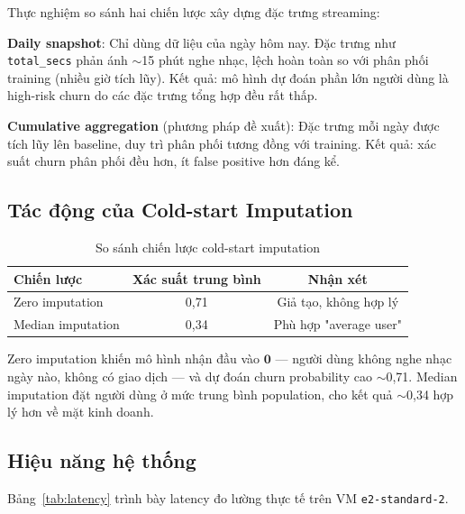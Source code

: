\documentclass[conference]{IEEEtran}
\begin{document}
Thực nghiệm so sánh hai chiến lược xây dựng đặc trưng streaming:

\textbf{Daily snapshot}: Chỉ dùng dữ liệu của ngày hôm nay. Đặc trưng như
\texttt{total\_secs} phản ánh $\sim$15 phút nghe nhạc, lệch hoàn toàn so với
phân phối training (nhiều giờ tích lũy). Kết quả: mô hình dự đoán phần lớn
người dùng là high-risk churn do các đặc trưng tổng hợp đều rất thấp.

\textbf{Cumulative aggregation} (phương pháp đề xuất): Đặc trưng mỗi ngày
được tích lũy lên baseline, duy trì phân phối tương đồng với training.
Kết quả: xác suất churn phân phối đều hơn, ít false positive hơn đáng kể.

\subsection{Tác động của Cold-start Imputation}

\begin{table}[htbp]
\caption{So sánh chiến lược cold-start imputation}
\label{tab:coldstart}
\centering
\begin{tabular}{lcc}
\toprule
\textbf{Chiến lược} & \textbf{Xác suất trung bình} & \textbf{Nhận xét} \\
\midrule
Zero imputation    & 0,71 & Giả tạo, không hợp lý \\
Median imputation  & 0,34 & Phù hợp "average user" \\
\bottomrule
\end{tabular}
\end{table}

Zero imputation khiến mô hình nhận đầu vào $\mathbf{0}$ — người dùng không
nghe nhạc ngày nào, không có giao dịch — và dự đoán churn probability cao
$\sim$0,71. Median imputation đặt người dùng ở mức trung bình population,
cho kết quả $\sim$0,34 hợp lý hơn về mặt kinh doanh.

\subsection{Hiệu năng hệ thống}

Bảng~\ref{tab:latency} trình bày latency đo lường thực tế trên VM
\texttt{e2-standard-2}.
\end{document}
